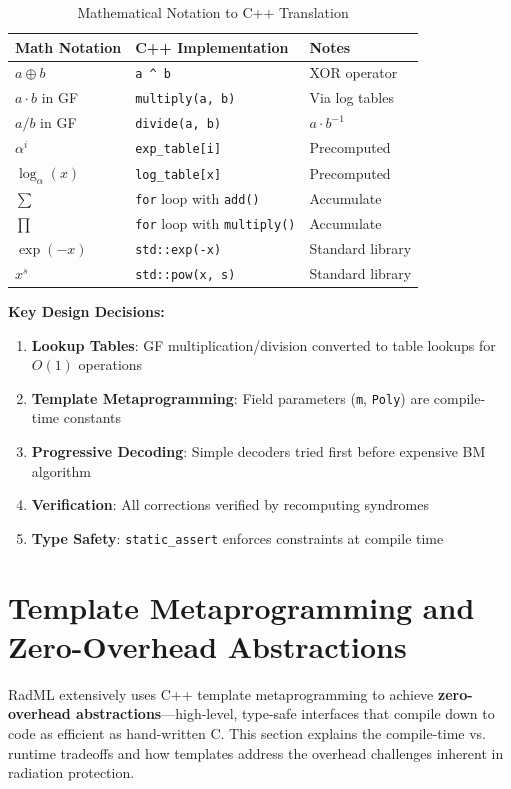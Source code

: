 \documentclass[11pt,a4paper]{article}
\begin{document}
\begin{table}[htbp]
\centering
\caption{Mathematical Notation to C++ Translation}
\begin{tabular}{@{}lll@{}}
\toprule
\textbf{Math Notation} & \textbf{C++ Implementation} & \textbf{Notes} \\ \midrule
$a \oplus b$ & \texttt{a \^{} b} & XOR operator \\
$a \cdot b$ in GF & \texttt{multiply(a, b)} & Via log tables \\
$a / b$ in GF & \texttt{divide(a, b)} & $a \cdot b^{-1}$ \\
$\alpha^i$ & \texttt{exp\_table[i]} & Precomputed \\
$\log_\alpha(x)$ & \texttt{log\_table[x]} & Precomputed \\
$\sum$ & \texttt{for} loop with \texttt{add()} & Accumulate \\
$\prod$ & \texttt{for} loop with \texttt{multiply()} & Accumulate \\
$\exp(-x)$ & \texttt{std::exp(-x)} & Standard library \\
$x^s$ & \texttt{std::pow(x, s)} & Standard library \\
\bottomrule
\end{tabular}
\end{table}

\textbf{Key Design Decisions:}
\begin{enumerate}
    \item \textbf{Lookup Tables}: GF multiplication/division converted to table lookups for $O(1)$ operations
    \item \textbf{Template Metaprogramming}: Field parameters (\texttt{m}, \texttt{Poly}) are compile-time constants
    \item \textbf{Progressive Decoding}: Simple decoders tried first before expensive BM algorithm
    \item \textbf{Verification}: All corrections verified by recomputing syndromes
    \item \textbf{Type Safety}: \texttt{static\_assert} enforces constraints at compile time
\end{enumerate}

\newpage
\section{Template Metaprogramming and Zero-Overhead Abstractions}

RadML extensively uses C++ template metaprogramming to achieve \textbf{zero-overhead abstractions}---high-level, type-safe interfaces that compile down to code as efficient as hand-written C. This section explains the compile-time vs. runtime tradeoffs and how templates address the overhead challenges inherent in radiation protection.
\end{document}
